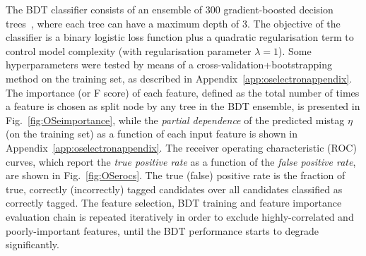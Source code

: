 The BDT classifier consists of an ensemble of 300 gradient-boosted decision trees~\cite{xgboost}, where each tree can have a maximum depth of 3. The objective of the classifier is a binary logistic loss function plus a quadratic regularisation term to control model complexity (with regularisation parameter $\lambda=1$). Some hyperparameters were tested by means of a cross-validation+bootstrapping method on the training set, as described in Appendix~\ref{app:oselectronappendix}. The importance (or F score) of each feature, defined as the total number of times a feature is chosen as split node by any tree in the BDT ensemble, is presented in Fig.~\ref{fig:OSeimportance}, while the \emph{partial dependence} of the predicted mistag $\eta$ (on the training set) as a function of each input feature is shown in Appendix~\ref{app:oselectronappendix}. 
The receiver operating characteristic (ROC) curves, which report the \emph{true positive rate}  
as a function of the \emph{false positive rate}, 
are shown in Fig.~\ref{fig:OSerocs}. 
The true (false) positive rate is the fraction of true, correctly (incorrectly) tagged candidates over all candidates classified as correctly tagged. 
The feature selection, BDT training and feature importance evaluation chain is repeated iteratively in order to exclude highly-correlated and poorly-important features, until the BDT performance starts to degrade significantly.

